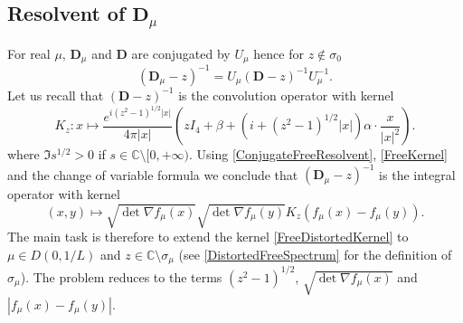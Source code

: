 \documentclass[a4paper, 12pt]{amsart}
\numberwithin{equation}{section}
\newcommand{\C}{\mathbb{C}} %
\newcommand{\lp}{\left(} %
\newcommand{\rp}{\right)} %
\newcommand{\lv}{\left\vert} %
\newcommand{\rv}{\right\vert} %
\newcommand{\Dvec}{\mathbf{D}}
\begin{document}
\subsection*{Resolvent of $\Dvec_\mu$} For real $\mu$, $\Dvec_\mu$ and $\Dvec$ are conjugated by $U_\mu$ hence for $z\not\in\sigma_0$
\begin{equation}\label{ConjugateFreeResolvent}
    (\Dvec_\mu-z)^{-1}=U_\mu(\Dvec -z)^{-1}U_\mu^{-1}.
\end{equation}
Let us recall that $(\Dvec -z)^{-1}$ is the convolution operator with kernel
\begin{equation}\label{FreeKernel}
    K_z:x\mapsto\frac{e^{ i(z^2-1)^{1/2}\lv x\rv}}{4\pi\lv x\rv}\lp zI_4+\beta+\lp i+(z^2-1)^{1/2}\lv x\rv\rp\alpha\cdot\frac{ x}{\lv x\rv^2}\rp.
\end{equation}
where $\Im s^{1/2}>0$ if $s\in\C\setminus[0,+\infty)$. Using \eqref{ConjugateFreeResolvent}, \eqref{FreeKernel} and the change of variable formula we conclude that $(\Dvec_\mu-z)^{-1}$ is the integral operator with kernel 
\begin{equation}\label{FreeDistortedKernel}
    (x,y)\mapsto\sqrt{\det \nabla f_\mu(x)}\sqrt{\det \nabla f_\mu(y)}K_z\lp f_\mu(x)- f_\mu(y)\rp.
\end{equation}
The main task is therefore to extend the kernel \eqref{FreeDistortedKernel} to $\mu\in D(0,1/L)$ and $z\in\C\setminus\sigma_\mu$ (see \eqref{DistortedFreeSpectrum} for the definition of $\sigma_\mu$). The problem reduces to the terms $(z^2-1)^{1/2}$, $\sqrt{\det\nabla f_\mu(x)}$ and $\lv f_\mu(x)-f_\mu(y)\rv$.
\end{document}
